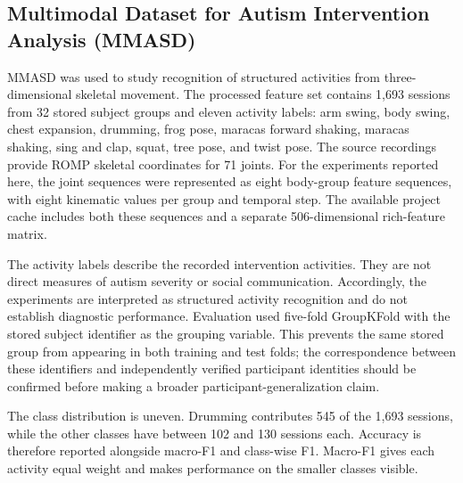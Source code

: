 \documentclass[a4paper,12pt]{report}
\begin{document}
\subsection*{Multimodal Dataset for Autism Intervention Analysis (MMASD)}

MMASD was used to study recognition of structured activities from three-dimensional skeletal movement. The processed feature set contains 1,693 sessions from 32 stored subject groups and eleven activity labels: arm swing, body swing, chest expansion, drumming, frog pose, maracas forward shaking, maracas shaking, sing and clap, squat, tree pose, and twist pose. The source recordings provide ROMP skeletal coordinates for 71 joints. For the experiments reported here, the joint sequences were represented as eight body-group feature sequences, with eight kinematic values per group and temporal step. The available project cache includes both these sequences and a separate 506-dimensional rich-feature matrix.

The activity labels describe the recorded intervention activities. They are not direct measures of autism severity or social communication. Accordingly, the experiments are interpreted as structured activity recognition and do not establish diagnostic performance. Evaluation used five-fold GroupKFold with the stored subject identifier as the grouping variable. This prevents the same stored group from appearing in both training and test folds; the correspondence between these identifiers and independently verified participant identities should be confirmed before making a broader participant-generalization claim.

The class distribution is uneven. Drumming contributes 545 of the 1,693 sessions, while the other classes have between 102 and 130 sessions each. Accuracy is therefore reported alongside macro-F1 and class-wise F1. Macro-F1 gives each activity equal weight and makes performance on the smaller classes visible.

\end{document}
